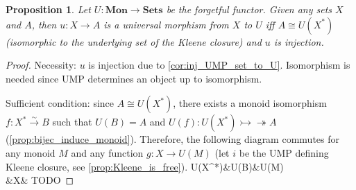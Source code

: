 \documentclass[12pt, letterpaper]{article}
\newcommand{\red}[1]{{\color{red} #1}}
\newenvironment{centikzcd}{\center\tikzcd}{\endtikzcd\endcenter}
\newtheorem{prop}{Proposition}[section]
\theoremstyle{definition}
\theoremstyle{remark}
\theoremstyle{definition}
\theoremstyle{plain}
\newcommand{\epimono}{{\rightarrowtail\!\!\!\!\!\twoheadrightarrow}}
\newcommand{\iso}{{\xrightarrow{\sim}}}
\numberwithin{equation}{section}
\begin{document}
	\begin{prop}\label{prop:free_monoid_condition}
		Let $U\colon \mathbf{Mon}\to\mathbf{Sets}$ be the forgetful functor.
		Given any sets $X$ and $A$, then
		$u\colon X\to A$ is a universal morphism from $X$ to $U$ iff
		$A\cong U(X^*)$ (isomorphic to the underlying set of the Kleene closure) and $u$ is injection.
	\end{prop}
	\begin{proof}
		Necessity: $u$ is injection due to \ref{cor:inj_UMP_set_to_U}.
		Isomorphism is needed since UMP determines an object up to isomorphism.
		
		Sufficient condition:
		since $A\cong U(X^*)$, there exists a monoid isomorphism 
		$f\colon X^* \iso B$ such that $U(B)=A$ and
		 $U(f)\colon U(X^*)\epimono A$
		(\ref{prop:bijec_induce_monoid}).
		Therefore, the following diagram
		commutes for any monoid $M$ and any function $g\colon X\to U(M)$
		(let $i$ be the UMP defining Kleene closure, see \ref{prop:Kleene_is_free}).
		\begin{centikzcd}
			U(X^*)&U(B)\ar[r,dashed]&U(M)\\
			&X\ar[lu,"i"]\ar[u,tail,"u"]\ar[ru,"\forall g"']&
		\end{centikzcd}
		\red{TODO}
	\end{proof}
\end{document}
